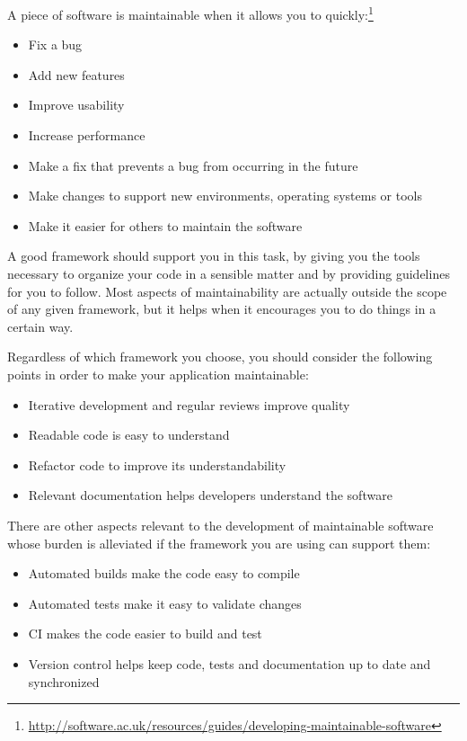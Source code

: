 A piece of software is maintainable when it allows you to quickly:\footnote{\url{http://software.ac.uk/resources/guides/developing-maintainable-software}}
\begin{itemize}
\item Fix a bug
\item Add new features
\item Improve usability
\item Increase performance
\item Make a fix that prevents a bug from occurring in the future
\item Make changes to support new environments, operating systems or tools
\item Make it easier for others to maintain the software
\end{itemize}

A good framework should support you in this task, by giving you the tools necessary to organize your code in a sensible matter and by providing guidelines for you to follow. Most aspects of maintainability are actually outside the scope of any given framework, but it helps when it encourages you to do things in a certain way.

Regardless of which framework you choose, you should consider the following points in order to make your application maintainable:

\begin{itemize}
\item Iterative development and regular reviews improve quality
\item Readable code is easy to understand
\item Refactor code to improve its understandability
\item Relevant documentation helps developers understand the software
\end{itemize}

There are other aspects relevant to the development of maintainable software whose burden is alleviated if the framework you are using can support them:  
\begin{itemize}
\item Automated builds make the code easy to compile
\item Automated tests make it easy to validate changes
\item \ac{CI} makes the code easier to build and test
\item Version control helps keep code, tests and documentation up to date and synchronized
\end{itemize}

